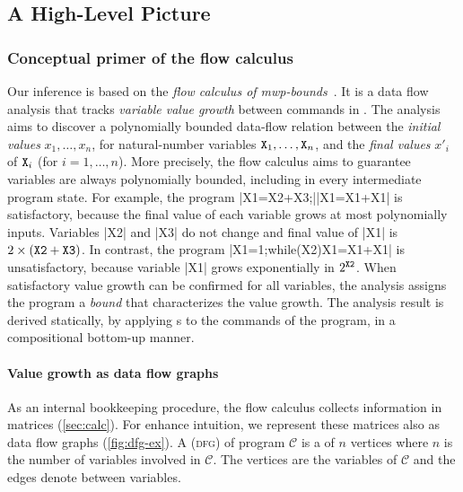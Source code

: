 \subsection{A High-Level Picture}
\label{sec:prelim}

\subsubsection{Conceptual primer of the flow calculus}
\label{subsec:flow-calc-intro}

Our  inference is based on the \emph{flow calculus of
mwp-bounds}~\cite{jones2009,aubert20222}. It is a data flow
analysis that tracks \emph{variable value growth} between commands in
. The analysis aims to discover a polynomially bounded
data-flow relation between the \emph{initial values}
\(x_1,\ldots,x_n\), for natural-number variables
\(\prm{X}_1,\ldots,\prm{X}_n\), and the \emph{final values}
\(x'_i\) of \(\prm{X}_i\) (for \(i=1,\ldots,n\)). More precisely,
the flow calculus aims to guarantee variables are always polynomially bounded,
including in every intermediate program state. For example, the program
\pr|X1=X2+X3;|\pr|X1=X1+X1| is satisfactory, because the final value of each
variable grows at most polynomially \wrt inputs. Variables \pr|X2| and \pr|X3|
do not change and final value of \pr|X1| is \(2 \times (\prm{X2} + \prm{X3})\).
In contrast, the program \pr|X1=1;while(X2){X1=X1+X1}| is unsatisfactory,
because variable \pr|X1| grows exponentially in \(2^{\prm{X2}}\). When
satisfactory value growth can be confirmed for all variables, the analysis
assigns the program a \emph{bound} that characterizes the value growth. The
analysis result is derived statically, by applying s to the
commands of the program, in a compositional bottom-up
manner.

\paragraph*{Value growth as data flow graphs}
As an internal bookkeeping procedure, the flow calculus collects information in
matrices (\autoref{sec:calc}). For enhance intuition, we represent these
matrices also as data flow graphs (\autoref{fig:dfg-ex}). A \emph{} (\textsc{dfg}) of program \(\mathcal{C}\) is a
 of \(n\) vertices where \(n\) is the number of variables
involved in \(\mathcal{C}\). The vertices are the variables of
\(\mathcal{C}\) and the edges denote  between
variables.

